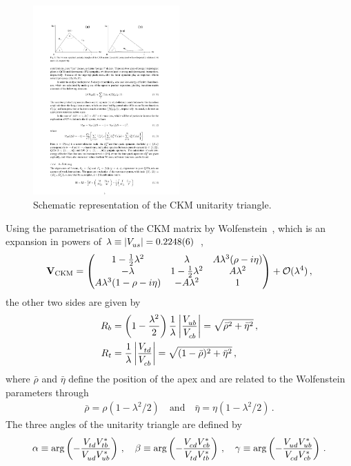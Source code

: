 \begin{figure}[htb]
\centering
\includegraphics[width=0.5\textwidth]{03-CPViolation/figs/CKMtriangle_prelim.pdf}
\caption{Schematic representation of the CKM unitarity triangle.}
\label{fig:cpviolation:ckmtriangle}
\end{figure}
Using the parametrisation of the CKM matrix by
Wolfenstein~\cite{Wolfenstein:1983yz}, which is an expansion in powers of
$\lambda \equiv |\Vus| = \num{0.2248\pm0.0006}$~\cite{PDG2016},
\begin{align}
\matr{V}_{\text{CKM}} =
\begin{pmatrix}
1 - \frac 12 \lambda^2 & \lambda & A\lambda^3(\rho - i\eta) \\
- \lambda & 1 - \frac 12 \lambda^2 & A\lambda^2 \\
A\lambda^3(1 - \rho - i\eta) & -A\lambda^2 & 1
\end{pmatrix}
+ \mathcal{O}(\lambda^4)\,,
\end{align}
the other two sides are given by
\begin{align}
	R_b &= \left(1 - \frac{\lambda^2}2\right)\frac 1\lambda \left|\frac \Vub\Vcb\right| = \sqrt{\bar{\rho}^2 + \bar{\eta}^2}\,,\label{eq:cpviolation:Rb}\\
	R_t &= \frac 1\lambda \left|\frac \Vtd\Vcb\right| = \sqrt{(1 - \bar{\rho})^2 + \bar{\eta}^2}\,,
\end{align}
where $\bar{\rho}$ and $\bar{\eta}$ define the position of the apex and are
related to the Wolfenstein parameters through
\begin{align}
	\bar{\rho} = \rho(1 - \lambda^2/2)\quad \text{and} \quad \bar{\eta} = \eta(1 - \lambda^2/2)\,.
\end{align}
The three angles of the unitarity triangle are defined by
\begin{align}
	\alpha \equiv \text{arg}\left(-\frac{\Vtd\Vtbs}{\Vud\Vubs}\right)\,,\quad
	\beta \equiv \text{arg}\left(-\frac{\Vcd\Vcbs}{\Vtd\Vtbs}\right)\,,\quad
	\gamma \equiv \text{arg}\left(-\frac{\Vud\Vubs}{\Vcd\Vcbs}\right)\,.
\label{eq:cpviolation:angles}
\end{align}


